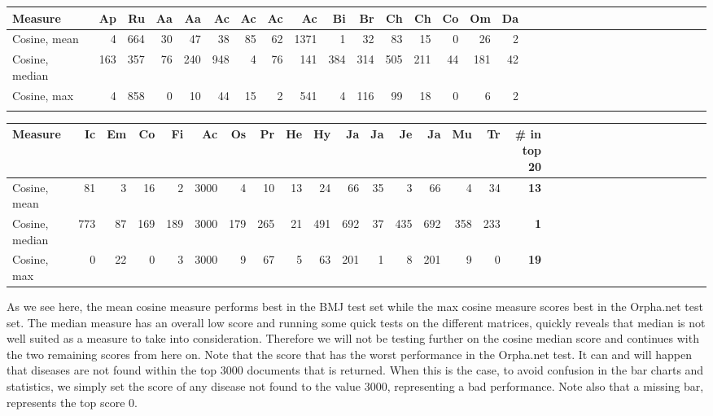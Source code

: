 \begin{table}[H]
\begin{tiny}
  \begin{tabular}{|l|r|r|r|r|r|r|r|r|r|r|r|r|r|r|r|r|r|r|r|r|r|r|r|r|r|r|r|r|r|r|r|}
    \hline
    Measure &Ap&Ru&Aa&Aa&Ac&Ac&Ac&Ac&Bi&Br&Ch&Ch&Co&Om&Da\\
    \hline
    Cosine, mean & 4 & 664 & 30 & 47 & 38 & 85 & 62 & 1371 & 1 & 32 & 83 & 15 & 0 & 26 & 2 \\
    \hline
    Cosine, median & 163 & 357 & 76 & 240 & 948 & 4 & 76 & 141 & 384 & 314 & 505 & 211 & 44 & 181 & 42 \\
    \hline
    Cosine, max & 4 & 858 & 0 & 10 & 44 & 15 & 2 & 541 & 4 & 116 & 99 & 18 & 0 & 6 & 2\\
    \hline
    \multicolumn{16}{c}{} \\
    \end{tabular}
    \begin{tabular}{|l|r|r|r|r|r|r|r|r|r|r|r|r|r|r|r|r|r|r|r|r|r|r|r|r|r|r|r|r|r|r|}
    \hline
     Measure &Ic&Em&Co&Fi&Ac&Os&Pr&He&Hy&Ja&Ja&Je&Ja&Mu&Tr &  \scriptsize{\textbf{\# in top 20}} \\
    \hline
     Cosine, mean & 81 & 3 & 16 & 2 & 3000 & 4 & 10 & 13 & 24 & 66 & 35 & 3 & 66 & 4 & 34 & \scriptsize{\textbf{13}} \\
    \hline
    Cosine, median & 773 & 87 & 169 & 189 & 3000 & 179 & 265 & 21 & 491 & 692 & 37 & 435 & 692 & 358 & 233 & \scriptsize{\textbf{1}} \\
    \hline
     Cosine, max  & 0 & 22 & 0 & 3 & 3000 & 9 & 67 & 5 & 63 & 201 & 1 & 8 & 201 & 9 & 0 & \scriptsize{\textbf{19}} \\
     \hline
  \end{tabular}
\end{tiny}
\end{table}

As we see here, the mean cosine measure performs best in the BMJ test
set while the max cosine measure scores best in the Orpha.net test
set. The median measure has an overall low score and running some
quick tests on the different matrices, quickly reveals that median is
not well suited as a measure to take into consideration. Therefore we
will not be testing further on the cosine median score and continues
with the two remaining scores from here on. Note that the score that
has the worst performance in the Orpha.net test. It can and will
happen that diseases are not found within the top 3000 documents that
is returned. When this is the case, to avoid confusion in the bar
charts and statistics, we simply set the score of any disease not
found to the value 3000, representing a bad performance. Note also
that a missing bar, represents the top score 0. \\

